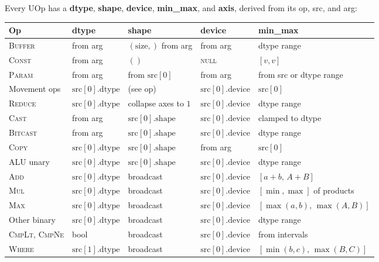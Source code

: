 \documentclass[10pt,letterpaper]{article}
\newcommand{\op}[1]{\textsc{#1}}
\begin{document}
Every UOp has a \textbf{dtype}, \textbf{shape}, \textbf{device}, \textbf{min\_max}, and \textbf{axis}, derived from its op, src, and arg:

\medskip
\begin{tabular}{@{}l l l l l@{}}
\toprule
\textbf{Op} & \textbf{dtype} & \textbf{shape} & \textbf{device} & \textbf{min\_max} \\
\midrule
\op{Buffer} & from arg & $(\text{size},)$ from arg & from arg & dtype range \\
\op{Const} & from arg & $()$ & \textsc{null} & $[v, v]$ \\
\op{Param} & from arg & from $\mathrm{src}[0]$ & from arg & from src or dtype range \\[3pt]
Movement ops & $\mathrm{src}[0].\mathrm{dtype}$ & (see op) & $\mathrm{src}[0].\mathrm{device}$ & $\mathrm{src}[0]$ \\
\op{Reduce} & $\mathrm{src}[0].\mathrm{dtype}$ & collapse axes to $1$ & $\mathrm{src}[0].\mathrm{device}$ & dtype range \\[3pt]
\op{Cast} & from arg & $\mathrm{src}[0].\mathrm{shape}$ & $\mathrm{src}[0].\mathrm{device}$ & clamped to dtype \\
\op{Bitcast} & from arg & $\mathrm{src}[0].\mathrm{shape}$ & $\mathrm{src}[0].\mathrm{device}$ & dtype range \\
\op{Copy} & $\mathrm{src}[0].\mathrm{dtype}$ & $\mathrm{src}[0].\mathrm{shape}$ & from arg & $\mathrm{src}[0]$ \\
ALU unary & $\mathrm{src}[0].\mathrm{dtype}$ & $\mathrm{src}[0].\mathrm{shape}$ & $\mathrm{src}[0].\mathrm{device}$ & dtype range \\
\op{Add} & $\mathrm{src}[0].\mathrm{dtype}$ & broadcast & $\mathrm{src}[0].\mathrm{device}$ & $[a+b,\, A+B]$ \\
\op{Mul} & $\mathrm{src}[0].\mathrm{dtype}$ & broadcast & $\mathrm{src}[0].\mathrm{device}$ & $[\min,\max]$ of products \\
\op{Max} & $\mathrm{src}[0].\mathrm{dtype}$ & broadcast & $\mathrm{src}[0].\mathrm{device}$ & $[\max(a,b),\, \max(A,B)]$ \\
Other binary & $\mathrm{src}[0].\mathrm{dtype}$ & broadcast & $\mathrm{src}[0].\mathrm{device}$ & dtype range \\
\op{CmpLt}, \op{CmpNe} & bool & broadcast & $\mathrm{src}[0].\mathrm{device}$ & from intervals \\
\op{Where} & $\mathrm{src}[1].\mathrm{dtype}$ & broadcast & $\mathrm{src}[0].\mathrm{device}$ & $[\min(b,c),\, \max(B,C)]$ \\[3pt]

\end{tabular}
\end{document}
